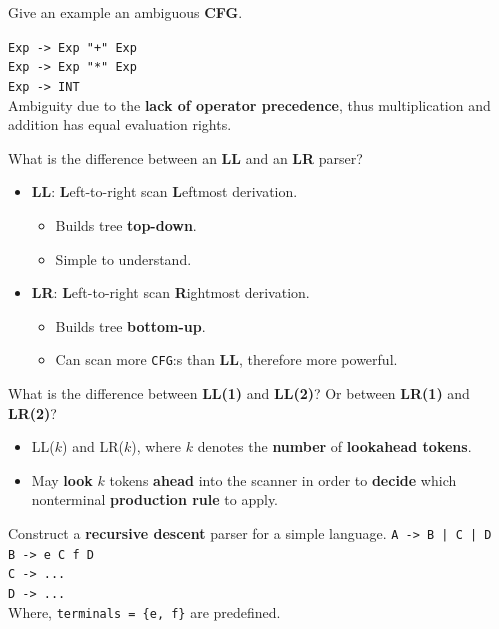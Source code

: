 \documentclass[11pt]{beamer}
\begin{document}
\begin{frame}

\begin{block}{Give an example an ambiguous \textbf{CFG}.}

\texttt{Exp -> Exp "+" Exp }\\
\texttt{Exp -> Exp "*" Exp }\\
\texttt{Exp -> INT}\\
Ambiguity due to the \textbf{lack of operator precedence}, thus multiplication and addition has equal evaluation rights.
\end{block}

\begin{block}{What is the difference between an \textbf{LL }and an \textbf{LR }parser?}
\begin{itemize}
\item \textbf{LL}: \textbf{L}eft-to-right scan \textbf{L}eftmost derivation.
\begin{itemize}
\item Builds tree \textbf{top-down}.
\item Simple to understand.
\end{itemize}
\item \textbf{LR}: \textbf{L}eft-to-right scan \textbf{R}ightmost derivation.
\begin{itemize}
\item Builds tree \textbf{bottom-up}.
\item Can scan more \texttt{CFG}:s than \textbf{LL}, therefore more powerful.
\end{itemize}
\end{itemize}
\end{block}

\end{frame}

\begin{frame}

\begin{block}{What is the difference between \textbf{LL(1)} and \textbf{LL(2)}? Or between \textbf{LR(1)} and \textbf{LR(2)}?}
\begin{itemize}
\item LL($k$) and LR($k$), where $k$ denotes the \textbf{number} of \textbf{lookahead tokens}.
\item May \textbf{look} $k$ tokens \textbf{ahead} into the scanner in order to \textbf{decide} which nonterminal \textbf{production rule} to apply.
\end{itemize}
\end{block}

\begin{block}{Construct a \textbf{recursive descent} parser for a simple language.}
\texttt{A -> B | C | D }\\
\texttt{B -> e C f D }\\
\texttt{C -> ...}\\
\texttt{D -> ...}\\
Where, \texttt{terminals = \{e, f\}} are predefined.
\end{block}

\end{frame}
\end{document}
